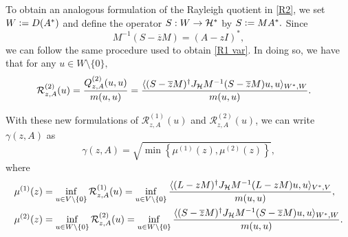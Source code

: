 To obtain an analogous formulation of the Rayleigh quotient in \eqref{R2},  we set $W \vcentcolon= D(A^*)$ and define the operator $S: W \rightarrow \mathcal{H}^*$ by $S \vcentcolon= MA^*.$
Since 
\begin{equation}
    M^{-1} (S - \overline{z} M) = (A - zI)^*,
\end{equation}
we can follow the same procedure used to obtain \eqref{R1 var}. In doing so, we have that for any $u \in W \setminus\{0\},$
\begin{align}
    \mathcal{R}_{z, A}^{(2)}(u) 
    &= \frac{Q_{z, A}^{(2)}(u, u)}{m(u, u)} 
    = \frac{\langle (S-\overline{z}M)^{\dagger}J_{\mathcal{H}} M^{-1} (S-\overline{z}M)u, u \rangle_{W^*, W} }{m(u, u)}.
\end{align}


With these new formulations of $\mathcal{R}_{z, A}^{(1)}(u)$ and $\mathcal{R}_{z, A}^{(2)}(u)$, we can write $\gamma(z, A)$ as 
\begin{equation}
    \gamma(z, A) = \sqrt{ \min\left\{\mu^{(1)}(z), \mu^{(2)}(z) \right\}},
\end{equation}
where 
\begin{align}
    \mu^{(1)}(z) &= \inf_{u \in V \setminus\{0\}} \mathcal{R}_{z, A}^{(1)}(u)  = \inf_{u \in V \setminus\{0\}}\frac{\langle (L-zM)^{\dagger}J_{\mathcal{H}} M^{-1} (L-zM)u, u \rangle_{V^*, V} }{m(u, u)}, \label{mu1}\\
        \mu^{(2)}(z) &= \inf_{u \in W \setminus\{0\}} \mathcal{R}_{z, A}^{(2)}(u)  =\inf_{u \in W \setminus\{0\}} \frac{\langle (S-\overline{z}M)^{\dagger}J_{\mathcal{H}} M^{-1} (S-\overline{z}M)u, u \rangle_{W^*, W} }{m(u, u)}.\label{mu2}
\end{align}



